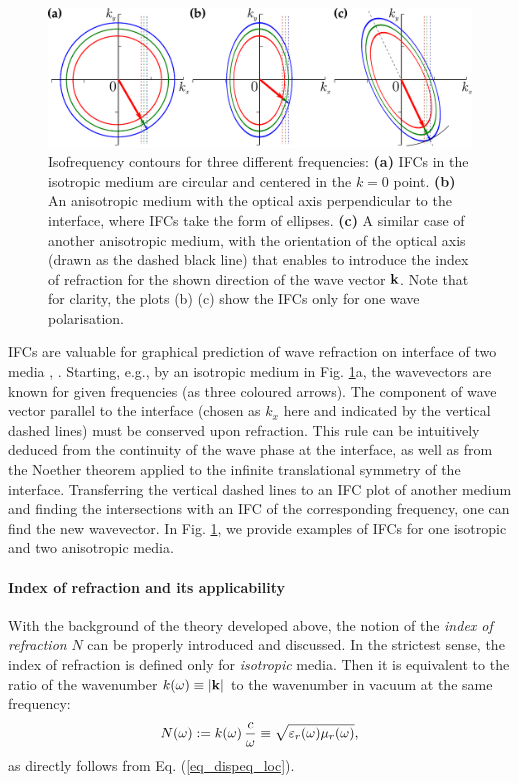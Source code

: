 \begin{figure}[ht] \caption{Isofrequency contours for three different frequencies: \textbf{(a)} IFCs in the isotropic medium are circular and centered in the $k=0$ point. \textbf{(b)} An anisotropic medium with the optical axis perpendicular to the interface, where IFCs take the form of ellipses. \textbf{(c)} A similar case of another anisotropic medium, with the orientation of the optical axis (drawn as the dashed black line) that enables to introduce the index of refraction for the shown direction of the wave vector ${\mathbf{k}}$. Note that for clarity, the plots (b) (c) show the IFCs only for one wave polarisation. %
} \label{fg_ifc} \centering  %
	\includegraphics[width=.8\textwidth]{img/ifc_freqdispersion.pdf} 
\end{figure}
IFCs are valuable for graphical prediction of wave refraction on interface of two media \cite[p. 118]{shalaev2010book}, \cite{boardman2005negative}. Starting, e.g., by an isotropic medium in Fig. \ref{fg_ifc}a, the wavevectors are known for given frequencies (as three coloured arrows).
The component of wave vector parallel to the interface (chosen as $k_x$ here and indicated by the vertical dashed lines) must be conserved upon refraction. This rule can be intuitively deduced from the continuity of the wave phase at the interface, as well as from the Noether theorem applied to the infinite translational symmetry of the interface. Transferring the vertical dashed lines to an IFC plot of another medium and finding the intersections with an IFC of the corresponding frequency, one can find the new wavevector. 
In Fig. \ref{fg_ifc}, we provide examples of IFCs for one isotropic and two anisotropic media.

\paragraph{Index of refraction and its applicability}  %
With the background of the theory developed above, the notion of the \textit{index of refraction} $N$ can be properly introduced and discussed. 
In the strictest sense, the index of refraction is defined only for \textit{isotropic} media. Then it is equivalent to the ratio of the wavenumber $k(\omega) \equiv |{\mathbf{k}}|$ to the wavenumber in vacuum at the same frequency: 
\begin{equation} N(\omega) := k(\omega) \, \frac{c}{\omega} \equiv \sqrt{\varepsilon_r(\omega)\mu_r(\omega)}, \label{eq_dispeqN}\end{equation}
as directly follows from Eq. (\ref{eq_dispeq_loc}).

